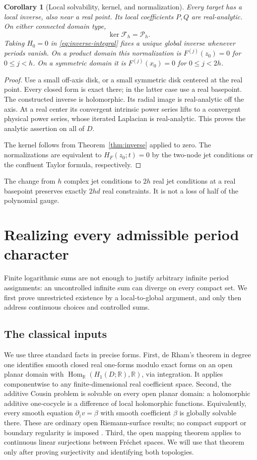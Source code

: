 \documentclass[11pt,a4paper]{article}
\numberwithin{equation}{section}
\newtheorem{corollary}[theorem]{Corollary}
\theoremstyle{definition}
\theoremstyle{remark}
\newcommand{\R}{\mathbb R}
\newcommand{\Fu}{\mathcal F_h}
\newcommand{\Pspace}{\mathscr P_h}
\newcommand{\dbar}{\partial_{\bar z}}
\begin{document}
\begin{corollary}[Local solvability, kernel, and normalization]
\label{cor:local}
Every target has a local inverse, also near a real point. Its local
coefficients $P,Q$ are real-analytic. On either connected domain type,
\[
 \ker\Fu=\Pspace.
\]
Taking $H_0=0$ in \eqref{eq:inverse-integral} fixes a unique global inverse
whenever periods vanish. On a product domain this normalization is
$F^{(j)}(z_0)=0$ for $0\le j<h$. On a symmetric domain it is
$F^{(j)}(x_0)=0$ for $0\le j<2h$.
\end{corollary}
\begin{proof}
Use a small off-axis disk, or a small symmetric disk centered at the real
point. Every closed form is exact there; in the latter case use a real
basepoint. The constructed inverse is holomorphic. Its radial image is
real-analytic off the axis. At a real center its convergent intrinsic power
series lifts to a convergent physical power series, whose iterated Laplacian
is real-analytic. This proves the analytic assertion on all of $D$.

The kernel follows from Theorem~\ref{thm:inverse} applied to zero. The
normalizations are equivalent to $H_F(z_0;t)=0$ by the two-node jet conditions
or the confluent Taylor formula, respectively.
\end{proof}

The change from $h$ complex jet conditions to $2h$ real jet conditions at a
real basepoint preserves exactly $2hd$ real constraints. It is not a loss of
half of the polynomial gauge.

\section{Realizing every admissible period character}
\label{sec:realization}

Finite logarithmic sums are not enough to justify arbitrary infinite period
assignments: an uncontrolled infinite sum can diverge on every compact set.
We first prove unrestricted existence by a local-to-global argument, and only
then address continuous choices and controlled sums.

\subsection{The classical inputs}

We use three standard facts in precise forms. First, de Rham's theorem in
degree one identifies smooth closed real one-forms modulo exact forms on an
open planar domain with $\operatorname{Hom}_\R(H_1(D;\R),\R)$, via integration.
It applies componentwise to any finite-dimensional real coefficient space.
Second, the additive Cousin problem is solvable on every open planar domain:
a holomorphic additive one-cocycle is a difference of local holomorphic
functions. Equivalently, every smooth equation $\dbar v=\beta$ with smooth
coefficient $\beta$ is globally solvable there. These are ordinary open
Riemann-surface results; no compact support or boundary regularity is imposed
\cite{forster}. Third, the open mapping theorem applies to continuous linear
surjections between Fr\'echet spaces. We will use that theorem only after
proving surjectivity and identifying both topologies.
\end{document}
